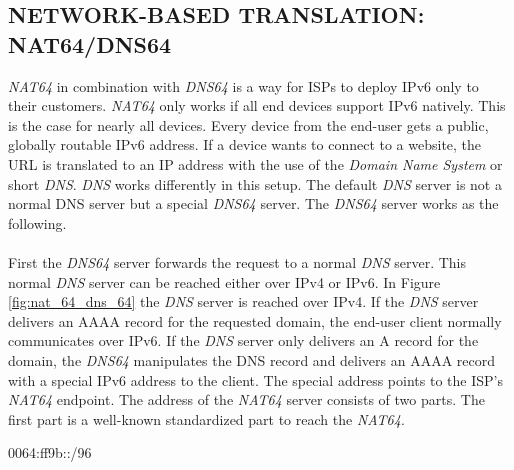 \documentclass[format=sigconf, natbib=true, nonacm=true]{acmart}
\begin{document}
    \subsection{NETWORK-BASED TRANSLATION: NAT64/DNS64}
    \textit{NAT64} in combination with \textit{DNS64} is a way for ISPs to deploy IPv6 only to their customers. \textit{NAT64} only works if all end devices support IPv6 natively. This is the case for nearly all devices. Every device from the end-user gets a public, globally routable IPv6 address. If a device wants to connect to a website, the URL is translated to an IP address with the use of the \textit{Domain Name System} or short \textit{DNS}. \textit{DNS} works differently in this setup. The default \textit{DNS} server is not a normal DNS server but a special \textit{DNS64} server. The \textit{DNS64} server works as the following.\\\\First the \textit{DNS64} server forwards the request to a normal \textit{DNS} server. This normal \textit{DNS} server can be reached either over IPv4 or IPv6. In Figure \ref{fig:nat_64_dns_64} the \textit{DNS} server is reached over IPv4. If the \textit{DNS} server delivers an AAAA record for the requested domain, the end-user client normally communicates over IPv6. If the \textit{DNS} server only delivers an A record for the domain, the \textit{DNS64} manipulates the DNS record and delivers an AAAA record with a special IPv6 address to the client. The special address points to the ISP's \textit{NAT64} endpoint. The address of the \textit{NAT64} server consists of two parts. The first part is a well-known standardized part to reach the \textit{NAT64}.
    \begin{center}
        0064:ff9b::/96
    \end{center}
\end{document}
